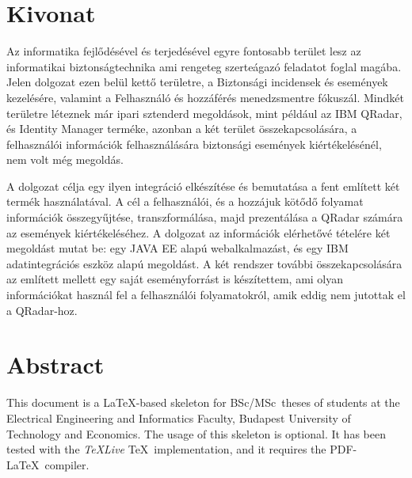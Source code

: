 \setcounter{page}{1}

\selecthungarian

\chapter*{Kivonat}

Az informatika fejlődésével és terjedésével egyre fontosabb terület lesz az informatikai biztonságtechnika ami rengeteg szerteágazó feladatot foglal magába. Jelen dolgozat ezen belül kettő területre, a Biztonsági incidensek és események kezelésére, valamint a Felhasználó és hozzáférés menedzsmentre fókuszál. Mindkét területre léteznek már ipari sztenderd megoldások, mint például az IBM QRadar, és Identity Manager terméke, azonban a két terület összekapcsolására, a felhasználói információk felhasználására biztonsági események kiértékelésénél, nem volt még megoldás. 

A dolgozat célja egy ilyen integráció elkészítése és bemutatása a fent említett két termék használatával. A cél a felhasználói, és a hozzájuk kötődő folyamat információk összegyűjtése, transzformálása, majd prezentálása a QRadar számára az események kiértékeléséhez. A dolgozat az információk elérhetővé tételére két megoldást mutat be: egy JAVA EE alapú webalkalmazást, és egy IBM adatintegrációs eszköz alapú megoldást. A két rendszer további összekapcsolására az említett mellett egy saját eseményforrást is készítettem, ami olyan információkat használ fel a felhasználói folyamatokról, amik eddig nem jutottak el a QRadar-hoz.


\vfill
\selectenglish


\chapter*{Abstract}

This document is a \LaTeX-based skeleton for BSc/MSc~theses of students at the Electrical Engineering and Informatics Faculty, Budapest University of Technology and Economics. The usage of this skeleton is optional. It has been tested with the \emph{TeXLive} \TeX~implementation, and it requires the PDF-\LaTeX~compiler.


\vfill
\selectthesislanguage

\setcounter{romanPage}{\value{page}}
